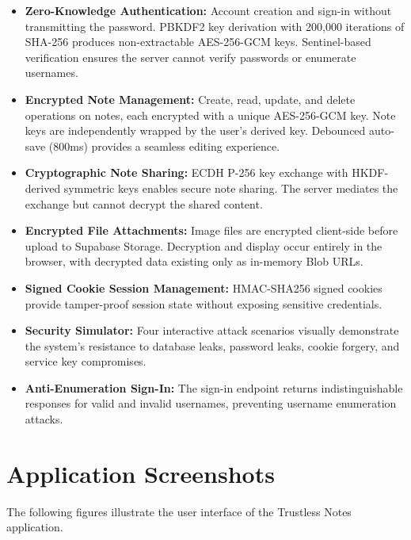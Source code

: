 \begin{itemize}
    \item \textbf{Zero-Knowledge Authentication:} Account creation and sign-in without transmitting the password. PBKDF2 key derivation with 200,000 iterations of SHA-256 produces non-extractable AES-256-GCM keys. Sentinel-based verification ensures the server cannot verify passwords or enumerate usernames.

    \item \textbf{Encrypted Note Management:} Create, read, update, and delete operations on notes, each encrypted with a unique AES-256-GCM key. Note keys are independently wrapped by the user's derived key. Debounced auto-save (800ms) provides a seamless editing experience.

    \item \textbf{Cryptographic Note Sharing:} ECDH P-256 key exchange with HKDF-derived symmetric keys enables secure note sharing. The server mediates the exchange but cannot decrypt the shared content.

    \item \textbf{Encrypted File Attachments:} Image files are encrypted client-side before upload to Supabase Storage. Decryption and display occur entirely in the browser, with decrypted data existing only as in-memory Blob URLs.

    \item \textbf{Signed Cookie Session Management:} HMAC-SHA256 signed cookies provide tamper-proof session state without exposing sensitive credentials.

    \item \textbf{Security Simulator:} Four interactive attack scenarios visually demonstrate the system's resistance to database leaks, password leaks, cookie forgery, and service key compromises.

    \item \textbf{Anti-Enumeration Sign-In:} The sign-in endpoint returns indistinguishable responses for valid and invalid usernames, preventing username enumeration attacks.
\end{itemize}

\section{Application Screenshots}

The following figures illustrate the user interface of the Trustless Notes application.

